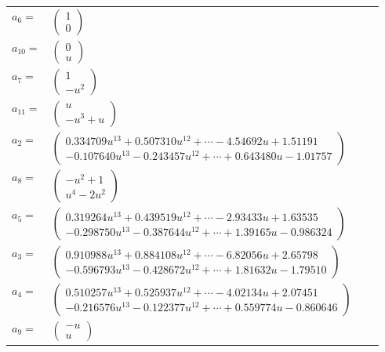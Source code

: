 \documentclass[1p]{elsarticle_modified}
\theoremstyle{definition}
\begin{document}
\begin{tabular}{m{7pt} m{180pt} m{7pt} m{180pt} }
\flushright $a_{6}=$&$\begin{pmatrix}1\\0\end{pmatrix}$ \\
\flushright $a_{10}=$&$\begin{pmatrix}0\\u\end{pmatrix}$ \\
\flushright $a_{7}=$&$\begin{pmatrix}1\\- u^2\end{pmatrix}$ \\
\flushright $a_{11}=$&$\begin{pmatrix}u\\- u^3+u\end{pmatrix}$ \\
\flushright $a_{2}=$&$\begin{pmatrix}0.334709 u^{13}+0.507310 u^{12}+\cdots-4.54692 u+1.51191\\-0.107640 u^{13}-0.243457 u^{12}+\cdots+0.643480 u-1.01757\end{pmatrix}$ \\
\flushright $a_{8}=$&$\begin{pmatrix}- u^2+1\\u^4-2 u^2\end{pmatrix}$ \\
\flushright $a_{5}=$&$\begin{pmatrix}0.319264 u^{13}+0.439519 u^{12}+\cdots-2.93433 u+1.63535\\-0.298750 u^{13}-0.387644 u^{12}+\cdots+1.39165 u-0.986324\end{pmatrix}$ \\
\flushright $a_{3}=$&$\begin{pmatrix}0.910988 u^{13}+0.884108 u^{12}+\cdots-6.82056 u+2.65798\\-0.596793 u^{13}-0.428672 u^{12}+\cdots+1.81632 u-1.79510\end{pmatrix}$ \\
\flushright $a_{4}=$&$\begin{pmatrix}0.510257 u^{13}+0.525937 u^{12}+\cdots-4.02134 u+2.07451\\-0.216576 u^{13}-0.122377 u^{12}+\cdots+0.559774 u-0.860646\end{pmatrix}$ \\
\flushright $a_{9}=$&$\begin{pmatrix}- u\\u\end{pmatrix}$ \\

\end{tabular}
\end{document}
